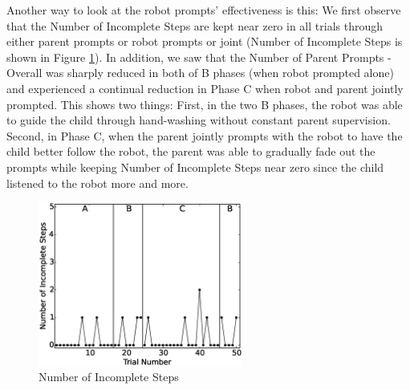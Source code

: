 Another way to look at the robot prompts' effectiveness is this: We first observe that the Number of Incomplete Steps are kept near zero in all trials through either parent prompts or robot prompts or joint (Number of Incomplete Steps is shown in Figure \ref{fig:4NumberofIncompleteSteps}).  In addition, we saw that the Number of Parent Prompts - Overall was sharply reduced in both of B phases (when robot prompted alone) and experienced a continual reduction in Phase C when robot and parent jointly prompted.  This shows two things: First, in the two B phases, the robot was able to guide the child through hand-washing without constant parent supervision.  Second, in Phase C, when the parent jointly prompts with the robot to have the child better follow the robot, the parent was able to gradually fade out the prompts while keeping Number of Incomplete Steps near zero since the child listened to the robot more and more.
\begin{figure} [h]
	\centering
	\includegraphics[width=0.6\textwidth]{./img/data_analysis/4NumberofIncompleteSteps.eps}
	\caption{Number of Incomplete Steps}
	\label{fig:4NumberofIncompleteSteps}
\end{figure}

